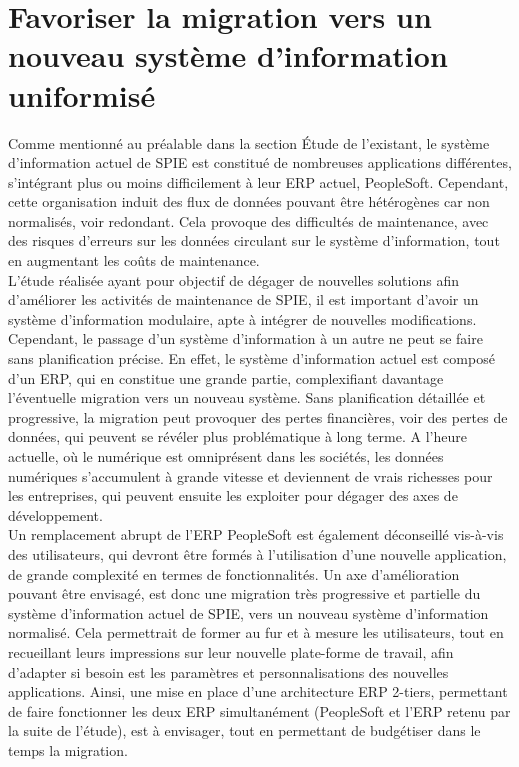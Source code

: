 
\section{Favoriser la migration vers un nouveau système d’information uniformisé}

Comme mentionné au préalable dans la section Étude de l’existant, le système d’information actuel de SPIE est constitué de nombreuses applications différentes, s’intégrant plus ou moins difficilement à leur ERP actuel, PeopleSoft. Cependant, cette organisation induit des flux de données pouvant être hétérogènes car non normalisés, voir redondant. Cela provoque des difficultés de maintenance, avec des risques d’erreurs sur les données circulant sur le système d’information, tout en augmentant les coûts de maintenance. \\

L’étude réalisée ayant pour objectif de dégager de nouvelles solutions afin d’améliorer les activités de maintenance de SPIE, il est important d’avoir un système d’information modulaire, apte à intégrer de nouvelles modifications. Cependant, le passage d’un système d’information à un autre ne peut se faire sans planification précise. En effet, le système d’information actuel est composé d’un ERP, qui en constitue une grande partie, complexifiant davantage l’éventuelle migration vers un nouveau système. Sans planification détaillée et progressive, la migration peut provoquer des pertes financières, voir des pertes de données, qui peuvent se révéler plus problématique à long terme. A l’heure actuelle, où le numérique est omniprésent dans les sociétés, les données numériques s’accumulent à grande vitesse et deviennent de vrais richesses pour les entreprises, qui peuvent ensuite les exploiter pour dégager des axes de développement. \\

Un remplacement abrupt de l’ERP PeopleSoft est également déconseillé vis-à-vis des utilisateurs, qui devront être formés à l’utilisation d’une nouvelle application, de grande complexité en termes de fonctionnalités. Un axe d’amélioration pouvant être envisagé, est donc une migration très progressive et partielle du système d’information actuel de SPIE, vers un nouveau système d’information normalisé. Cela permettrait de former au fur et à mesure les utilisateurs, tout en recueillant leurs impressions sur leur nouvelle plate-forme de travail, afin d’adapter si besoin est les paramètres et personnalisations des nouvelles applications. Ainsi, une mise en place d’une architecture ERP 2-tiers, permettant de faire fonctionner les deux ERP simultanément (PeopleSoft et l’ERP retenu par la suite de l’étude), est à envisager, tout en permettant de budgétiser dans le temps la migration.

